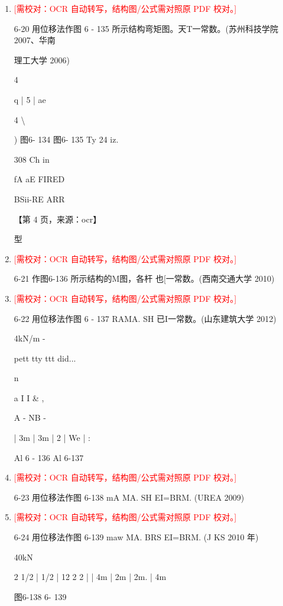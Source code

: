\documentclass[UTF8,12pt,a4paper,openany]{ctexbook}
\newcommand{\TODO}[1]{\textcolor{red}{[需校对：#1]}}
\begin{document}
\begin{enumerate}[label=\textbf{\arabic*.},leftmargin=2em]
\item \TODO{OCR 自动转写，结构图/公式需对照原 PDF 校对。}\par 6-20 用位移法作图 6 - 135 所示结构弯矩图。天T一常数。(苏州科技学院 2007、华南\par 理工大学 2006)\par 4\par q           |           5  |        ae\par 4                        \textbackslash{}\par )                                 图6- 134                                        图6- 135         Ty 24  iz.\par 308                                                                                                                        Ch in\par fA aE FIRED\par BSii-RE ARR\par \par 【第 4 页，来源：ocr】\par 型
\item \TODO{OCR 自动转写，结构图/公式需对照原 PDF 校对。}\par 6-21 作图6-136 所示结构的M图，各杆 也[一常数。(西南交通大学 2010)
\item \TODO{OCR 自动转写，结构图/公式需对照原 PDF 校对。}\par 6-22 用位移法作图 6 - 137 RAMA. SH 已I一常数。(山东建筑大学 2012)\par 4kN/m                                           -\par pett tty ttt did...\par n\par a         I          I            \&                                            ,\par A          -                NB                                    -\par |       3m      |      3m   |   2    |   We    |                :\par Al 6 - 136                                      Al 6-137
\item \TODO{OCR 自动转写，结构图/公式需对照原 PDF 校对。}\par 6-23 用位移法作图 6-138 mA MA. SH EI=BRM. (UREA 2009)
\item \TODO{OCR 自动转写，结构图/公式需对照原 PDF 校对。}\par 6-24 用位移法作图 6-139 maw MA. BRS EI=BRM. (J KS 2010 年)\par 40kN\par 2   1/2  |   1/2  |  12   2  2  |                 |     4m     |  2m  |  2m. |    4m\par 图6-138 6- 139

\end{enumerate}
\end{document}
